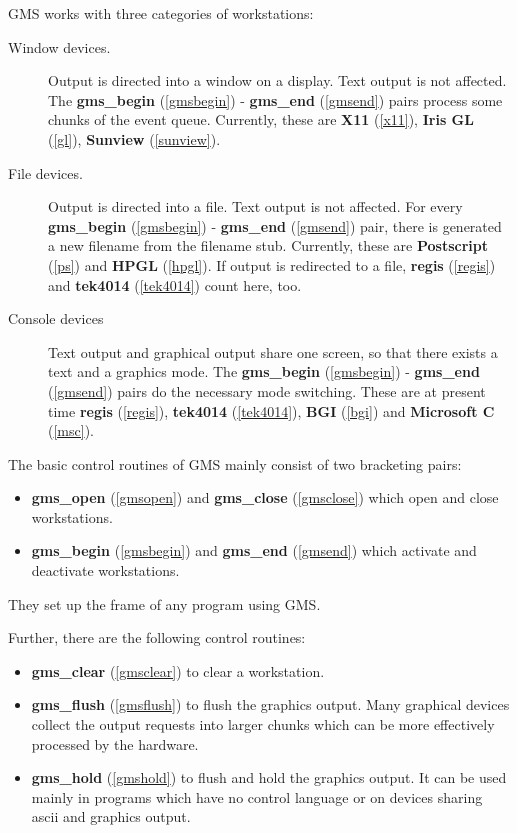 GMS works with three categories of workstations:
\begin{description}
 

\item[Window devices.]\mbox{}

 Output is directed into a window on a 
display. 
Text output is not affected.
The 
{\bf gms\_begin} (\ref{gmsbegin}) -
{\bf gms\_end} (\ref{gmsend}) pairs
process some chunks of the event queue.
Currently, these are 
{\bf X11} (\ref{x11}), 
{\bf Iris GL} (\ref{gl}), 
{\bf Sunview} (\ref{sunview}). 
 

\item[File devices.]\mbox{}

 Output is directed into a file. 
Text output is not affected.
For every 
{\bf gms\_begin} (\ref{gmsbegin}) -
{\bf gms\_end} (\ref{gmsend}) pair, there is generated 
a new filename from the filename stub.
Currently, these are 
{\bf Postscript} (\ref{ps}) and
{\bf HPGL} (\ref{hpgl}).
If output is redirected to a file, 
{\bf regis} (\ref{regis})  and 
{\bf tek4014} (\ref{tek4014}) count here, too. 

\item[Console devices]\mbox{}


Text output and graphical output share one screen, so that 
there exists a text and a graphics mode.
The 
{\bf gms\_begin} (\ref{gmsbegin}) -
{\bf gms\_end} (\ref{gmsend}) pairs
do the necessary mode switching.
These are at present time
{\bf regis} (\ref{regis}),
{\bf tek4014} (\ref{tek4014}),
{\bf BGI} (\ref{bgi}) and 
{\bf Microsoft C} (\ref{msc}). 
\end{description}






The basic control routines of GMS mainly consist of 
two bracketing pairs:
\begin{itemize}
\item  
{\bf gms\_open} (\ref{gmsopen}) and
{\bf gms\_close} (\ref{gmsclose}) which open and
close workstations. 
          
\item  
{\bf gms\_begin} (\ref{gmsbegin}) and
{\bf gms\_end} (\ref{gmsend}) which activate and
deactivate  workstations.
\end{itemize}
 

They set up the frame of any program using GMS.

Further, there are the following control
routines:
\begin{itemize}
\item  
{\bf gms\_clear} (\ref{gmsclear}) 
to clear a workstation.
\item  
{\bf gms\_flush} (\ref{gmsflush}) 
to flush the graphics output. Many graphical devices collect the
output requests into larger chunks which can be more effectively
processed by the hardware.
\item  
{\bf gms\_hold} (\ref{gmshold}) 
to flush and hold the graphics output. It can be used mainly in programs
which have no control language or on devices sharing ascii and
graphics output.
\end{itemize}
 




